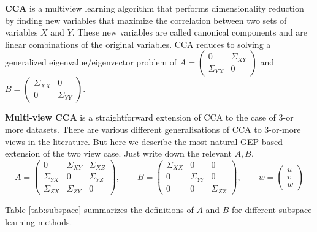 \textbf{CCA} is a multiview learning algorithm that performs dimensionality reduction by finding new variables that maximize the correlation between two sets of variables $X$ and $Y$. These new variables are called canonical components and are linear combinations of the original variables. CCA reduces to solving a generalized eigenvalue/eigenvector problem of $A=\begin{pmatrix} 0 & \Sigma_{XY} \\ \Sigma_{YX} & 0\end{pmatrix}$ and $B=\begin{pmatrix} \Sigma_{XX} & 0 \\ 0 & \Sigma_{YY} \end{pmatrix}$.

\textbf{Multi-view CCA} is a straightforward extension of CCA to the case of 3-or more datasets.
There are various different generalisations of CCA to 3-or-more views in the literature.
But here we describe the most natural GEP-based extension of the two view case. Just write down the relevant $A,B$.
\begin{equation}\label{eq:multi-view-cca-GEV}
    A = \begin{pmatrix} 0 &\Sigma_{XY} & \Sigma_{XZ} \\ \Sigma_{YX} & 0 & \Sigma_{YZ} \\ \Sigma_{ZX} & \Sigma_{ZY} & 0 \end{pmatrix}, \qquad
    B = \begin{pmatrix}\Sigma_{XX} & 0 & 0 \\ 0 & \Sigma_{YY} & 0 \\ 0 & 0 & \Sigma_{ZZ} \end{pmatrix}, \qquad
    w =\begin{pmatrix}	u \\ v \\ w \end{pmatrix}
\end{equation}

Table \ref{tab:subspace} summarizes the definitions of $A$ and $B$ for different subspace learning methods.


